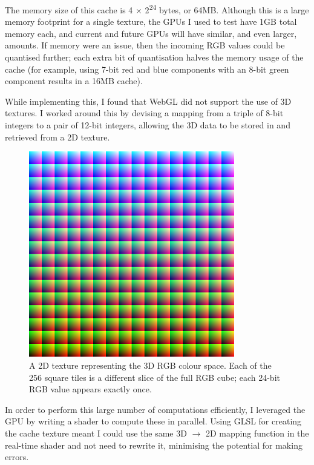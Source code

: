 \documentclass[12pt,twoside,notitlepage]{report}
\begin{document}
The memory size of this cache is 4 $\times$ 2\textsuperscript{24} bytes, or 64MB. Although this is a large memory footprint for a single texture, the GPUs I used to test have 1GB total memory each, and current and future GPUs will have similar, and even larger, amounts. If memory were an issue, then the incoming RGB values could be quantised further; each extra bit of quantisation halves the memory usage of the cache (for example, using 7-bit red and blue components with an 8-bit green component results in a 16MB cache).

While implementing this, I found that WebGL did not support the use of 3D textures. I worked around this by devising a mapping from a triple of 8-bit integers to a pair of 12-bit integers, allowing the 3D data to be stored in and retrieved from a 2D texture.

\begin{figure}[h!]
\centering
\includegraphics[width=0.8\textwidth]{rgbcache}
\caption{A 2D texture representing the 3D RGB colour space. Each of the 256 square tiles is a different slice of the full RGB cube; each 24-bit RGB value appears exactly once.}
\end{figure}

In order to perform this large number of computations efficiently, I leveraged the GPU by writing a shader to compute these in parallel. Using GLSL for creating the cache texture meant I could use the same 3D $\rightarrow$ 2D mapping function in the real-time shader and not need to rewrite it, minimising the potential for making errors.
\end{document}
